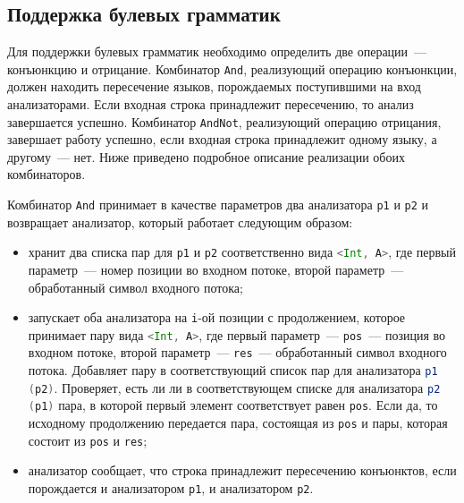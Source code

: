   
  \subsection{Поддержка булевых грамматик}
Для поддержки булевых грамматик необходимо определить две операции~--- конъюнкцию и отрицание. Комбинатор \lstinline[language=Scala]{And}, реализующий операцию конъюнкции, должен находить пересечение языков, порождаемых поступившими на вход анализаторами. Если входная строка принадлежит пересечению, то анализ завершается успешно. Комбинатор \lstinline[language=Scala]{AndNot}, реализующий операцию отрицания, завершает работу успешно, если входная строка принадлежит одному языку, а другому~--- нет. Ниже приведено подробное описание реализации обоих комбинаторов.

Комбинатор \lstinline[language=Scala]{And} принимает в качестве параметров два анализатора \lstinline[language=Scala]{p1} и \lstinline[language=Scala]{p2} и возвращает анализатор, который работает следующим образом: 
\begin{itemize}
    \item хранит два списка пар  для \lstinline[language=Scala]{p1} и \lstinline[language=Scala]{p2} соответственно вида \lstinline[language=Scala]{<Int, A>}, где первый параметр~--- номер позиции во входном потоке, второй параметр~--- обработанный символ входного потока;
    \item запускает оба анализатора на \lstinline[language=Scala]{i}-ой позиции с продолжением, которое принимает пару вида \lstinline[language=Scala]{<Int, A>}, где первый параметр~--- \lstinline[language=Scala]{pos}~--- позиция во входном потоке, второй параметр~--- \lstinline[language=Scala]{res}~--- обработанный символ входного потока. Добавляет пару в соответствующий список пар для анализатора \lstinline[language=Scala]{p1 (p2)}. Проверяет, есть ли ли в соответствующем списке для анализатора \lstinline[language=Scala]{p2 (p1)} пара, в которой первый элемент соответствует равен \lstinline[language=Scala]{pos}. Если да, то исходному продолжению передается пара, состоящая из \lstinline[language=Scala]{pos} и пары, которая состоит из \lstinline[language=Scala]{pos} и \lstinline[language=Scala]{res};
    \item анализатор сообщает, что строка принадлежит пересечению конъюнктов, если порождается и анализатором \lstinline[language=Scala]{p1}, и анализатором \lstinline[language=Scala]{p2}.
\end{itemize}

